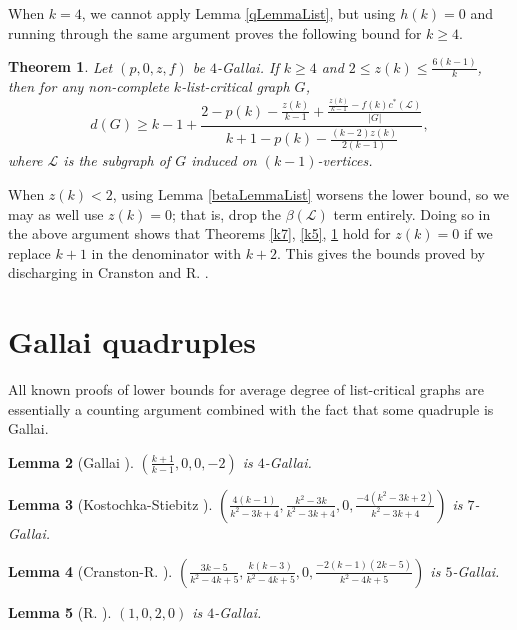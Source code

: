 \documentclass[10pt]{article}
\renewcommand{\ge}{\geqslant}
\renewcommand{\le}{\leqslant}
\theoremstyle{plain}
\newtheorem{thm}{Theorem}[section]
\newtheorem{lem}[thm]{Lemma}
\theoremstyle{definition}
\theoremstyle{remark}
\newcommand{\fancy}[1]{\mathcal{#1}}
\renewcommand{\L}{\fancy{L}}
\newcommand{\card}[1]{\left|#1\right|}
\newcommand{\parens}[1]{\left( #1 \right)}
\begin{document}
\noindent When $k=4$, we cannot apply Lemma \ref{qLemmaList}, but using $h(k)=0$ and running through the same argument proves the following bound for $k\ge 4$.
\begin{thm}\label{k4}
	Let $\parens{p,0,z,f}$ be $4$-Gallai.  If $k \ge 4$ and $2 \le z(k) \le \frac{6(k-1)}{k}$, then for any non-complete $k$-list-critical graph $G$,
	\[d(G) \ge k-1 + \frac{2 - p(k) - \frac{z(k)}{k-1} + \frac{\frac{z(k)}{k-1} - f(k)c^*(\L)}{\card{G}}}{k+1 - p(k) - \frac{(k-2)z(k)}{2(k-1)}},\]
	where $\L$ is the subgraph of $G$ induced on $(k-1)$-vertices.
\end{thm}

When $z(k) < 2$, using Lemma \ref{betaLemmaList} worsens the lower bound, so we may as well use $z(k)=0$; that is, drop the $\beta(\L)$ term entirely.  
Doing so in the above argument shows that Theorems \ref{k7}, \ref{k5}, \ref{k4} hold for $z(k) = 0$ if we replace $k+1$ in the denominator with $k+2$.  
This gives the bounds proved by discharging in Cranston and R. \cite{DischargingLowerBound}.

\section{Gallai quadruples}
All known proofs of lower bounds for average degree of list-critical graphs are essentially a counting argument combined with the fact that some quadruple is Gallai.

\begin{lem}[Gallai \cite{gallai1963kritische}]
$\parens{\frac{k+1}{k-1}, 0, 0, -2}$ is $4$-Gallai.
\end{lem}

\begin{lem}[Kostochka-Stiebitz \cite{kostochkastiebitzedgesincriticalgraph}]
$\parens{\frac{4(k-1)}{k^2 - 3k + 4}, \frac{k^2 - 3k}{k^2-3k+4}, 0, \frac{-4(k^2-3k+2)}{k^2-3k+4}}$ is $7$-Gallai.
\end{lem}

\begin{lem}[Cranston-R. \cite{DischargingLowerBound}]
$\parens{\frac{3k-5}{k^2-4k+5}, \frac{k(k-3)}{k^2-4k+5}, 0, \frac{-2(k-1)(2k-5)}{k^2-4k+5}}$ is $5$-Gallai.
\end{lem}

\begin{lem}[R. \cite{Better4ListCriticalBound}]\label{Rbound}
$\parens{1, 0, 2, 0}$ is $4$-Gallai.
\end{lem}
\end{document}
